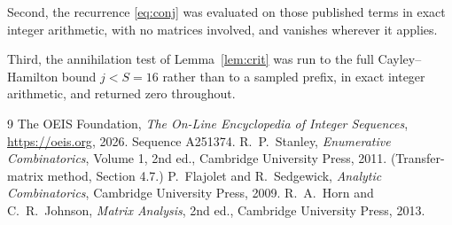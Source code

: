 \documentclass[11pt,a4paper]{article}
\theoremstyle{plain}
\theoremstyle{definition}
\begin{document}
Second, the recurrence \eqref{eq:conj} was evaluated on those published terms in exact
integer arithmetic, with no matrices involved, and vanishes wherever it applies.

Third, the annihilation test of Lemma~\ref{lem:crit} was run to the full Cayley--Hamilton
bound $j<S=16$ rather than to a sampled prefix, in exact integer arithmetic, and returned
zero throughout.

\begin{thebibliography}{9}
 The OEIS Foundation, \emph{The On-Line Encyclopedia of Integer
Sequences}, \url{https://oeis.org}, 2026. Sequence A251374.
 R.~P.~Stanley, \emph{Enumerative Combinatorics}, Volume 1, 2nd ed.,
Cambridge University Press, 2011. (Transfer-matrix method, Section 4.7.)
 P.~Flajolet and R.~Sedgewick, \emph{Analytic Combinatorics}, Cambridge
University Press, 2009.
 R.~A.~Horn and C.~R.~Johnson, \emph{Matrix Analysis}, 2nd ed., Cambridge
University Press, 2013.
\end{thebibliography}
\end{document}
